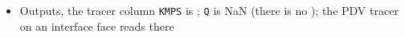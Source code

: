\documentclass[11pt,addpoints]{exam}
\begin{document}
\begin{tcolorbox}[breakable]
\begin{itemize}
\item Outputs, \hspace{3mm} the tracer column \texttt{KMPS} is ; \texttt{Q} is NaN (there is no ); the PDV tracer on an interface face reads  there
\end{itemize}
\end{tcolorbox}
\end{document}

